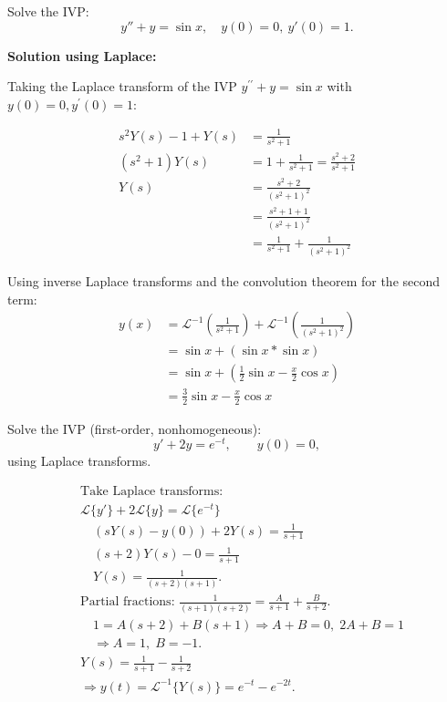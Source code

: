     \begin{example}
      Solve the IVP:
      \[
      y'' + y = \sin x, \quad y(0)=0, \ y'(0)=1.
      \]

      \textbf{Solution using Laplace:}

      Taking the Laplace transform of the IVP \(y^{\prime \prime }+y=\sin x\) with \(y(0)=0,y^{\prime }(0)=1\):
      
      \begin{align*}
        s^2Y(s) - 1 + Y(s) &= \frac{1}{s^2+1} \\
               (s^2+1)Y(s) &= 1 + \frac{1}{s^2+1} = \frac{s^2+2}{s^2+1} \\
                      Y(s) &= \frac{s^2+2}{(s^2+1)^2} \\
                           &= \frac{s^2+1+1}{(s^2+1)^2} \\
                           &= \frac{1}{s^2+1} + \frac{1}{(s^2+1)^2} 
      \end{align*}

      Using inverse Laplace transforms and the convolution theorem for the second term:
      \begin{align*}
        y(x) &= \mathcal{L}^{-1}\left( \frac{1}{s^2+1} \right) + \mathcal{L}^{-1}\left( \frac{1}{(s^2+1)^2} \right) \\
             &= \sin x + (\sin x * \sin x) \\ 
             &= \sin x + \left(\frac{1}{2}\sin x - \frac{x}{2}\cos x\right) \\
             &= \frac{3}{2}\sin x - \frac{x}{2}\cos{x}
      \end{align*}
    \end{example}


    \begin{marginfigure}
      
    \end{marginfigure}


    \begin{example}
      Solve the IVP (first-order, nonhomogeneous):
      \[
      y' + 2y = e^{-t},\qquad y(0)=0,
      \]
      using Laplace transforms.
    \end{example}

    \begin{align*}
      &\text{Take Laplace transforms:}\\
      &\mathcal{L}\{y'\} + 2\mathcal{L}\{y\} = \mathcal{L}\{e^{-t}\} \\
      &\quad (sY(s)-y(0)) + 2Y(s) = \frac{1}{s+1} \\
      &\quad (s+2)Y(s) - 0 = \frac{1}{s+1} \\
      &\quad Y(s) = \frac{1}{(s+2)(s+1)}.\\[6pt]
      &\text{Partial fractions: } \frac{1}{(s+1)(s+2)} = \frac{A}{s+1}+\frac{B}{s+2}.\\
      &\quad 1 = A(s+2)+B(s+1) \Rightarrow A+B=0,\; 2A+B=1 \\
      &\quad \Rightarrow A=1,\; B=-1.\\[6pt]
      &Y(s)=\frac{1}{s+1}-\frac{1}{s+2} \\
      &\Rightarrow y(t)=\mathcal{L}^{-1}\{Y(s)\} = e^{-t}-e^{-2t}.
    \end{align*}

